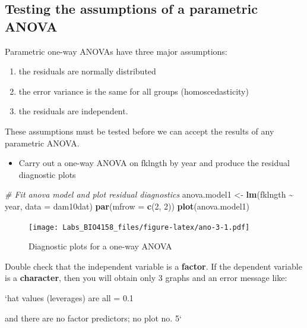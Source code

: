\documentclass[
  12pt,
]{book}
\makeatletter
\newenvironment{Shaded}{\begin{snugshade}}{\end{snugshade}}
\newcommand{\CommentTok}[1]{\textcolor[rgb]{0.56,0.35,0.01}{\textit{#1}}}
\newcommand{\DataTypeTok}[1]{\textcolor[rgb]{0.13,0.29,0.53}{#1}}
\newcommand{\DecValTok}[1]{\textcolor[rgb]{0.00,0.00,0.81}{#1}}
\newcommand{\KeywordTok}[1]{\textcolor[rgb]{0.13,0.29,0.53}{\textbf{#1}}}
\newcommand{\NormalTok}[1]{#1}
\newcommand{\OperatorTok}[1]{\textcolor[rgb]{0.81,0.36,0.00}{\textbf{#1}}}
\newcommand{\StringTok}[1]{\textcolor[rgb]{0.31,0.60,0.02}{#1}}
\providecommand{\tightlist}{%
  \setlength{\itemsep}{0pt}\setlength{\parskip}{0pt}}
\newenvironment{kframe}{%
\medskip{}
\setlength{\fboxsep}{.8em}
\def\at@end@of@kframe{}%
\ifinner\ifhmode%
 \def\at@end@of@kframe{\end{minipage}}%
 \begin{minipage}{\columnwidth}%
\fi\fi%
\def\FrameCommand##1{\hskip\@totalleftmargin \hskip-\fboxsep
\colorbox{incolor}{##1}\hskip-\fboxsep
    \hskip-\linewidth \hskip-\@totalleftmargin \hskip\columnwidth}%
\MakeFramed {\advance\hsize-\width
  \@totalleftmargin\z@ \linewidth\hsize
  \@setminipage}}%
{\par\unskip\endMakeFramed%
\at@end@of@kframe}
\newenvironment{rmdblock}[1]
 {
 \begin{itemize}
 \renewcommand{\labelitemi}{
   \raisebox{-.7\height}[0pt][0pt]{
     {\setkeys{Gin}{width=3em,keepaspectratio}\texttt{[image: images/\#1]}}
   }
 }
 \begin{kframe}
 \setlength{\fboxsep}{1em}
 \item
 }
 {
 \end{kframe}
 \end{itemize}
 }
\newenvironment{rmdwarning}
  {\begin{rmdblock}{warning}}
  {\end{rmdblock}}
\makeatother
\begin{document}
\hypertarget{testing-the-assumptions-of-a-parametric-anova}{%
\subsection{Testing the assumptions of a parametric ANOVA}\label{testing-the-assumptions-of-a-parametric-anova}}

Parametric one-way ANOVAs have three major assumptions:

\begin{enumerate}
\def\labelenumi{\arabic{enumi}.}
\tightlist
\item
  the residuals are normally distributed
\item
  the error variance is the same for all groups (homoscedasticity)
\item
  the residuals are independent.
\end{enumerate}

These assumptions must be tested before we can accept the results of any parametric ANOVA.

\begin{itemize}
\tightlist
\item
  Carry out a one-way ANOVA on fklngth by year and produce the residual diagnostic plots
\end{itemize}

\begin{Shaded}
\begin{Highlighting}[]
\CommentTok{\# Fit anova model and plot residual diagnostics}
\NormalTok{anova.model1 \textless{}{-}}\StringTok{ }\KeywordTok{lm}\NormalTok{(fklngth }\OperatorTok{\textasciitilde{}}\StringTok{ }\NormalTok{year, }\DataTypeTok{data =}\NormalTok{ dam10dat)}
\KeywordTok{par}\NormalTok{(}\DataTypeTok{mfrow =} \KeywordTok{c}\NormalTok{(}\DecValTok{2}\NormalTok{, }\DecValTok{2}\NormalTok{))}
\KeywordTok{plot}\NormalTok{(anova.model1)}
\end{Highlighting}
\end{Shaded}

\begin{figure}
\centering
\texttt{[image: Labs\_BIO4158\_files/figure-latex/ano-3-1.pdf]}
\caption{\label{fig:ano-3}Diagnostic plots for a one-way ANOVA}
\end{figure}

\begin{rmdwarning}
Double check that the independent variable is a \textbf{factor}. If the dependent variable is a \textbf{character}, then you will obtain only 3 graphs and an error message like:

`hat values (leverages) are all = 0.1

and there are no factor predictors; no plot no. 5`
\end{rmdwarning}
\end{document}

